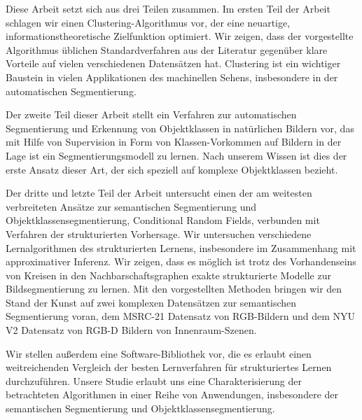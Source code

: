 \documentclass[12pt,toc=bibnumbered, a4paper,twoside,DIV=11,BCOR=.5cm]{scrbook}
\begin{document}
Diese Arbeit setzt sich aus drei Teilen zusammen.
Im ersten Teil der Arbeit schlagen wir einen Clustering-Algorithmus vor,
der eine neuartige, informationstheoretische Zielfunktion optimiert. Wir zeigen, dass
der vorgestellte Algorithmus \"ublichen Standardverfahren aus der Literatur gegen\"uber
klare Vorteile auf vielen verschiedenen Datens\"atzen hat. Clustering ist ein wichtiger
Baustein in vielen Applikationen des machinellen Sehens, insbesondere in der
automatischen Segmentierung.

Der zweite Teil dieser Arbeit stellt ein Verfahren zur automatischen
Segmentierung und Erkennung von Objektklassen in nat\"urlichen Bildern vor, das
mit Hilfe von Supervision in Form von Klassen-Vorkommen auf Bildern in der Lage
ist ein Segmentierungsmodell zu lernen. Nach unserem Wissen ist dies der erste
Ansatz dieser Art, der sich speziell auf komplexe Objektklassen bezieht.

Der dritte und letzte Teil der Arbeit untersucht einen der am weitesten
verbreiteten Ans\"atze zur semantischen Segmentierung und
Objektklassensegmentierung, Conditional Random Fields, verbunden mit Verfahren
der strukturierten Vorhersage.
%
Wir untersuchen verschiedene Lernalgorithmen des strukturierten Lernens, insbesondere
im Zusammenhang mit approximativer Inferenz. Wir zeigen, dass es m\"oglich ist trotz des Vorhandenseins von
Kreisen in den Nachbarschaftsgraphen exakte strukturierte Modelle zur Bildsegmentierung zu lernen.
Mit den vorgestellten Methoden bringen wir den Stand der Kunst
auf zwei komplexen Datens\"atzen zur semantischen Segmentierung voran, dem MSRC-21 Datensatz
von RGB-Bildern und dem NYU V2 Datensatz von RGB-D Bildern von Innenraum-Szenen.

\enlargethispage{15mm}
Wir stellen au{\ss}erdem eine Software-Bibliothek vor, die es erlaubt einen
weitreichenden Vergleich der besten Lernverfahren f\"ur strukturiertes Lernen
durchzuf\"uhren.
Unsere Studie erlaubt uns eine Charakterisierung der betrachteten Algorithmen
in einer Reihe von Anwendungen, insbesondere der semantischen Segmentierung und
Objektklassensegmentierung.

\end{document}
